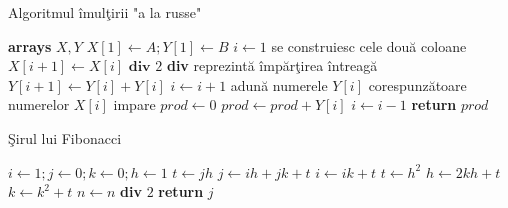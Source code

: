 \documentclass{article}
\begin{document}
\begin{algorithm}
\caption{Algoritmul îmulţirii "a la russe"}\label{russe}
\begin{algorithmic}[1]
	\State \textbf{arrays} $X, Y$
	\State $X[1] \gets A; Y[1] \gets B$ 
	\State $i \gets 1$ \Comment se construiesc cele două coloane
		\State $X[i+1] \gets X[i] \textbf{ div } 2$ \Comment \textbf{div} reprezintă împărţirea întreagă
		\State $Y[i+1] \gets Y[i] + Y[i]$
		\State $i \gets i+1$
	\EndWhile
	\Comment adună numerele $Y[i]$ corespunzătoare numerelor $X[i]$ impare
	\State $prod \gets 0$
			\State $prod \gets prod + Y[i]$
			\State $i \gets i - 1$
		\EndIf
	\EndWhile
	\State \textbf{return} $prod$
\EndProcedure
\end{algorithmic}
\end{algorithm}

\begin{algorithm}
\caption{Şirul lui Fibonacci}\label{fibonacci}
\begin{algorithmic}[1]
	\State $i \gets 1; j \gets 0; k \gets 0; h \gets 1$
			\State $t \gets jh$
			\State $j \gets ih + jk + t$
			\State $i \gets ik + t$
		\EndIf
		\State $t \gets h^2$
		\State $h \gets 2kh+t$
		\State $k \gets k^2+t$
		\State $n \gets n$ \textbf{div} $2$
	\EndWhile
	\State \textbf{return } $j$
\EndProcedure
\end{algorithmic}
\end{algorithm}
\end{document}
